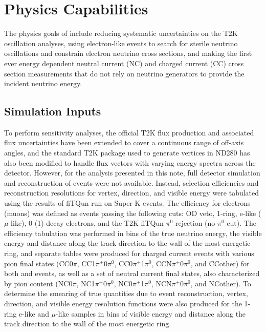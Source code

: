 \section{Physics Capabilities}\label{sec:physics}

The physics goals of \nuprismlite include reducing systematic uncertainties on the T2K oscillation analyses, using electron-like events to search for sterile neutrino oscillations and constrain electron neutrino cross sections, and making the first ever energy dependent neutral current (NC) and charged current (CC) cross section measurements that do not rely on neutrino generators to provide the incident neutrino energy. 



\subsection{Simulation Inputs \label{sec:nuprism_sim}}

To perform \nuprismlite sensitivity analyses, the official T2K flux production and associated flux uncertainties have been extended to cover a continuous range of off-axis angles, and the standard T2K package used to generate vertices in ND280 has also been modified to handle flux vectors with varying energy spectra across the detector. However, for the analysis presented in this note, full detector simulation and reconstruction of events were not available. Instead, selection efficiencies and reconstruction resolutions for vertex, direction, and visible energy were tabulated using the results of fiTQun run on Super-K events. The efficiency for electrons (muons) was defined as events passing the following cuts: OD veto, 1-ring, e-like ($\mu$-like), 0 (1) decay electrons, and the T2K fiTQun $\pi^0$ rejection (no $\pi^0$ cut). The efficiency tabulation was performed in bins of the true neutrino energy, the visible energy and distance along the track direction to the wall of the most energetic ring, and separate tables were produced for charged current events with various pion final states (CC0$\pi$, CC1$\pi^\pm$0$\pi^0$, CC0$\pi^\pm$1$\pi^0$, CCN$\pi^\pm$0$\pi^0$, and CCother) for both \nue and \numu events, as well as a set of neutral current final states, also characterized by pion content (NC0$\pi$, NC1$\pi^\pm$0$\pi^0$, NC0$\pi^\pm$1$\pi^0$, NCN$\pi^\pm$0$\pi^0$, and NCother). To determine the smearing of true quantities due to event reconstruction, vertex, direction, and visible energy resolution functions were also produced for the 1-ring e-like and $\mu$-like samples in bins of visible energy and distance along the track direction to the wall of the most energetic ring.

